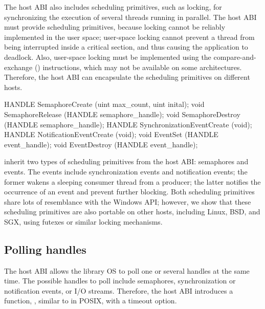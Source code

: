 The host ABI also includes scheduling primitives, such as locking, for synchronizing the execution
of several threads running in parallel.
The host ABI must provide scheduling primitives,
because locking cannot be reliably implemented in the user space;
user-space locking
cannot prevent a thread from being interrupted inside a critical section,
and thus 
causing the application to deadlock.
Also, user-space locking must be implemented using the compare-and-exchange () instructions, which may not be available on some architectures.
Therefore, the host ABI
can encapsulate the scheduling primitives on different hosts.



\begin{paldef}
HANDLE SemaphoreCreate  (uint max_count, uint inital);
void   SemaphoreRelease (HANDLE semaphore_handle);
void   SemaphoreDestroy (HANDLE semaphore_handle);
HANDLE SynchronizationEventCreate (void);
HANDLE NotificationEventCreate    (void);
void EventSet     (HANDLE event_handle);
void EventDestroy (HANDLE event_handle);
\end{paldef}



\graphene{} inherit two types of scheduling primitives
from the \drawbridge{} host ABI:
semaphores and events.
The events include synchronization events and notification events;
the former wakens a sleeping consumer thread
from a producer; the latter notifies the occurrence of an event and prevent further blocking.
Both scheduling primitives share lots of resemblance with the Windows API;
however, we show that these scheduling primitives are also portable on other hosts, including Linux, BSD, and SGX, using futexes or similar locking mechanisms.









\subsection*{Polling handles}


The host ABI allows the library OS to poll one or several handles
at the same time.
The possible handles to poll include semaphores, synchronization or notification events,
or I/O streams.
Therefore, the host ABI
introduces a function, , similar to  in POSIX,
with a timeout option.



